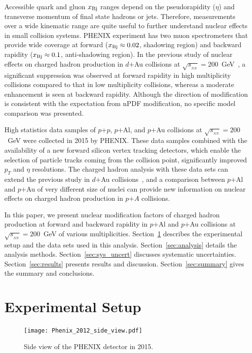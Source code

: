 \documentclass[twocolumn,letterpaper,aps,prc,longbibliography,superscriptaddress,nofootinbib,floatfix]{revtex4-2}
\newcommand{\pt}{\mbox{$p_T$}\xspace}
\newcommand{\sqsntwo}{\mbox{$\sqrt{s_{_{NN}}}=200$~GeV}\xspace}
\newcommand{\pp}{\mbox{$p$+$p$}\xspace}
\newcommand{\dau}{\mbox{$d$$+$Au}\xspace}
\newcommand{\pau}{\mbox{$p$$+$Au}\xspace}
\newcommand{\pal}{\mbox{$p$$+$Al}\xspace}
\newcommand{\xbj}{\mbox{$x_{\rm Bj}$}\xspace}
\begin{document}
Accessible quark and gluon \xbj ranges depend on the pseudorapidity 
($\eta$) and transverse momentum of final state hadrons or jets. 
Therefore, measurements over a wide kinematic range are quite useful to 
further understand nuclear effects in small collision systems. PHENIX 
experiment has two muon spectrometers that provide wide coverage at 
forward ($\xbj \approx 0.02$, shadowing region) and backward rapidity 
($\xbj \approx 0.1$, anti-shadowing region). In the previous study of 
nuclear effects on charged hadron production in \dau collisions at 
\sqsntwo~\cite{Adler:2004eh}, a significant suppression was observed at 
forward rapidity in high multiplicity collisions compared to that in low 
multiplicity collisions, whereas a moderate enhancement is seen at 
backward rapidity. Although the direction of modification is consistent 
with the expectation from nPDF modification, no specific model 
comparison was presented.

High statistics data samples of \pp, \pal, and \pau collisions at 
\sqsntwo were collected in 2015 by PHENIX. These data samples combined 
with the availability of a new forward silicon vertex tracking 
detectors, which enable the selection of particle tracks coming from the 
collision point, significantly improved \pt and $\eta$ resolutions. The 
charged hadron analysis with these data sets can extend the previous 
study in \dau collisions~\cite{Adler:2004eh}, and a comparison between 
\pal and \pau of very different size of nuclei can provide new 
information on nuclear effects on charged hadron production in $p$$+$$A$ 
collisions.

In this paper, we present nuclear modification factors of charged hadron 
production at forward and backward rapidity in \pal and \pau collisions 
at \sqsntwo of various multiplicities.  Section~\ref{sec:experiment} 
describes the experimental setup and the data sets used in this 
analysis.  Section~\ref{sec:analysis} details the analysis methods.  
Section~\ref{sec:sys_uncert} discusses systematic uncertainties.
Section~\ref{sec:results} presents results and discussion.
Section~\ref{sec:summary} gives the summary and conclusions.

\section{Experimental Setup}
\label{sec:experiment}

\begin{figure}[thb]
\texttt{[image: Phenix\_2012\_side\_view.pdf]}
\caption{\label{fig:PHENIX}
Side view of the PHENIX detector in 2015.}
\end{figure}
\end{document}
